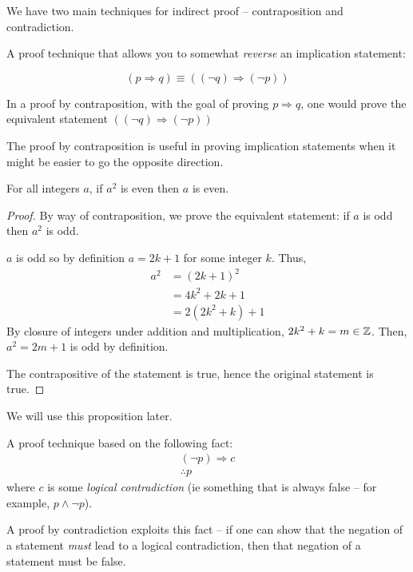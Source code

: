 \documentclass[main.tex]{subfiles}
\begin{document}
We have two main techniques for indirect proof -- contraposition and contradiction.

\begin{defn}
	A proof technique that allows you to somewhat \textit{reverse} an implication statement:
	
	\[(p \Rightarrow q) \equiv ((\lnot q) \Rightarrow (\lnot p))\]
	
	In a proof by contraposition, with the goal of proving \(p \Rightarrow q\), one would prove the equivalent statement \(((\lnot q) \Rightarrow (\lnot p))\)
\end{defn}

The proof by contraposition is useful in proving implication statements when it might be easier to go the opposite direction.

\begin{prop}\label{prop3.x:eucl-arg-lemma}
	For all integers \(a\), if \(a^2\) is even then \(a\) is even.
\end{prop}

\begin{proof}
	By way of contraposition, we prove the equivalent statement: if \(a\) is odd then \(a^2\) is odd.
	
	\(a\) is odd so by definition \(a = 2k+1\) for some integer \(k\). Thus,
	\begin{align*}
	a^2 &= (2k+1)^2 \\ &= 4k^2 + 2k + 1 \\ &= 2(2k^2 + k) + 1
	\end{align*}
	By closure of integers under addition and multiplication, \(2k^2 + k = m \in \mathbb{Z}\). Then, \(a^2 = 2m+1\) is odd by definition.
	
	The contrapositive of the statement is true, hence the original statement is true.
\end{proof}

We will use this proposition later.


\begin{defn}
	A proof technique based on the following fact:
	\begin{align*}
	(\lnot p) \Rightarrow c \\
	\therefore p
	\end{align*}
	where \(c\) is some \textit{logical contradiction} (ie something that is always false -- for example, \(p \land \lnot p\)).
	
	A proof by contradiction exploits this fact -- if one can show that the negation of a statement \textit{must} lead to a logical contradiction, then that negation of a statement must be false.
\end{defn}
\end{document}
